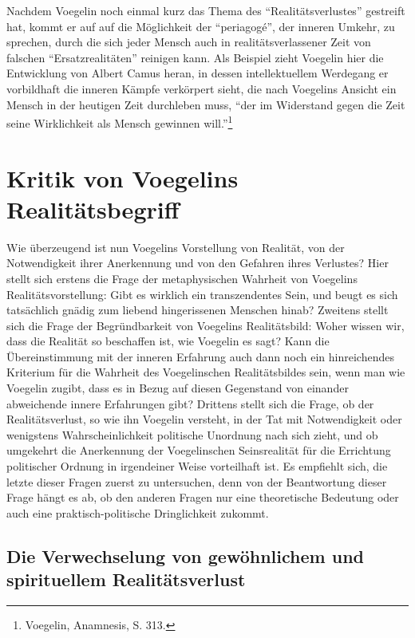 Nachdem Voegelin noch einmal kurz das Thema des "`Realitätsverlustes"'
gestreift hat, kommt er auf auf die Möglichkeit der "`periagogé"', der
inneren Umkehr, zu sprechen, durch die sich jeder Mensch auch in
realitätsverlassener Zeit von falschen "`Ersatzrealitäten"' reinigen kann. Als
Beispiel zieht Voegelin hier die Entwicklung von Albert Camus heran, in dessen
intellektuellem Werdegang er vorbildhaft die inneren Kämpfe verkörpert sieht,
die nach Voegelins Ansicht ein Mensch in der heutigen Zeit durchleben muss,
"`der im Widerstand gegen die Zeit seine Wirklichkeit als Mensch gewinnen
will."'\footnote{Voegelin, Anamnesis, S. 313.}

\section{Kritik von Voegelins Realitätsbegriff}
 
Wie überzeugend ist nun Voegelins Vorstellung von Realität, von der
Notwendigkeit ihrer Anerkennung und von den Gefahren ihres Verlustes? Hier
stellt sich erstens die Frage der metaphysischen Wahrheit von Voegelins
Realitätsvorstellung: Gibt es wirklich ein transzendentes Sein, und beugt es
sich tatsächlich gnädig zum liebend hingerissenen Menschen hinab? Zweitens
stellt sich die Frage der Begründbarkeit von Voegelins Realitätsbild: Woher
wissen wir, dass die Realität so beschaffen ist, wie Voegelin es sagt? Kann die
Übereinstimmung mit der inneren Erfahrung auch dann noch ein hinreichendes
Kriterium für die Wahrheit des Voegelinschen Realitätsbildes sein, wenn man
wie Voegelin zugibt, dass es in Bezug auf diesen Gegenstand von einander
abweichende innere Erfahrungen gibt? Drittens stellt sich die Frage, ob der
Realitätsverlust, so wie ihn Voegelin versteht, in der Tat mit Notwendigkeit
oder wenigstens Wahrscheinlichkeit politische Unordnung nach sich zieht, und
ob umgekehrt die Anerkennung der Voegelinschen Seinsrealität für die
Errichtung politischer Ordnung in irgendeiner Weise vorteilhaft ist. Es
empfiehlt sich, die letzte dieser Fragen zuerst zu untersuchen, denn von der
Beantwortung dieser Frage hängt es ab, ob den anderen Fragen nur eine
theoretische Bedeutung oder auch eine praktisch-politische Dringlichkeit
zukommt.

\subsection{Die Verwechselung von gewöhnlichem und spirituellem Realitätsverlust}


